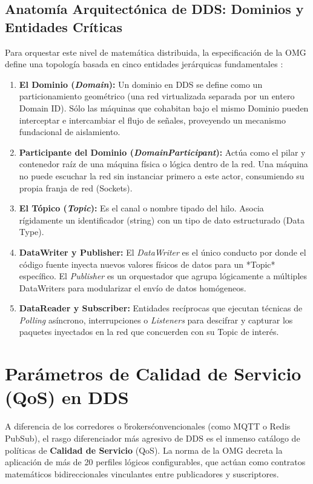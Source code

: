 \documentclass[11pt,a4paper,oneside]{report}
\begin{document}
\subsection{Anatom\'ia Arquitect\'onica de DDS: Dominios y Entidades Cr\'iticas}
Para orquestar este nivel de matem\'atica distribuida, la especificaci\'on de la OMG define una topolog\'ia basada en cinco entidades jer\'arquicas fundamentales \citep{omg2015}:
\begin{enumerate}
    \item \textbf{El Dominio (\textit{Domain}):} Un dominio en DDS se define como un particionamiento geom\'etrico (una red virtualizada separada por un entero Domain ID). S\'olo las m\'aquinas que cohabitan bajo el mismo Dominio pueden interceptar e intercambiar el flujo de se\~nales, proveyendo un mecanismo fundacional de aislamiento.
    \item \textbf{Participante del Dominio (\textit{DomainParticipant}):} Act\'ua como el pilar y contenedor ra\'iz de una m\'aquina f\'isica o l\'ogica dentro de la red. Una m\'aquina no puede escuchar la red sin instanciar primero a este actor, consumiendo su propia franja de red (Sockets).
    \item \textbf{El T\'opico (\textit{Topic}):} Es el canal o nombre tipado del hilo. Asocia r\'igidamente un identificador (string) con un tipo de dato estructurado (Data Type).
    \item \textbf{DataWriter y Publisher:} El \textit{DataWriter} es el \'unico conducto por donde el c\'odigo fuente inyecta nuevos valores f\'isicos de datos para un *Topic* espec\'ifico. El \textit{Publisher} es un orquestador que agrupa l\'ogicamente a m\'ultiples DataWriters para modularizar el env\'io de datos hom\'ogeneos.
    \item \textbf{DataReader y Subscriber:} Entidades rec\'iprocas que ejecutan t\'ecnicas de \textit{Polling} as\'incrono, interrupciones o \textit{Listeners} para descifrar y capturar los paquetes inyectados en la red que concuerden con su Topic de inter\'es.
\end{enumerate}

\section{Par\'ametros de Calidad de Servicio (QoS) en DDS}

A diferencia de los corredores o \'brokers\' convencionales (como MQTT o Redis PubSub), el rasgo diferenciador m\'as agresivo de DDS es el inmenso cat\'alogo de pol\'iticas de \textbf{Calidad de Servicio} (QoS). La norma de la OMG decreta la aplicaci\'on de m\'as de 20 perfiles l\'ogicos configurables, que act\'uan como contratos matem\'aticos bidireccionales vinculantes entre publicadores y suscriptores. 
\end{document}
